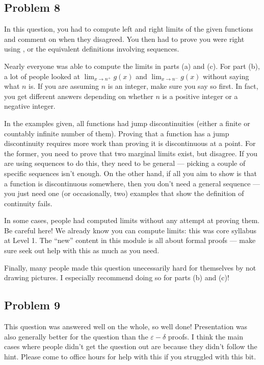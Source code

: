 \documentclass[letterpaper,10pt,english]{jupyterBook}
\begin{document}
\subsection{Problem 8}
\label{\detokenize{HW-feedback:problem-8}}
\sphinxAtStartPar
In this question, you had to compute left and right limits of the given functions and comment on when they disagreed. You then had to prove you were right using , or the equivalent definitions involving sequences.

\sphinxAtStartPar
Nearly everyone was able to compute the limits in parts (a) and (c). For part (b), a lot of people looked at \(\lim_{x\rightarrow n^+}g(x)\) and \(\lim_{x\rightarrow n^-}g(x)\) without saying what \(n\) is. If you are assuming \(n\) is an integer, make sure you say so first. In fact, you get different answers depending on whether \(n\) is a positive integer or a negative integer.

\sphinxAtStartPar
In the examples given, all functions had jump discontinuities (either a finite or countably infinite number of them). Proving that a function has a jump discontinuity requires more work than proving it is discontinuous at a point. For the former, you need to prove that two marginal limits exist, but disagree. If you are using sequences to do this, they need to be general — picking a couple of specific sequences isn’t enough. On the other hand, if all you aim to show is that a function is discontinuous somewhere, then you don’t need a general sequence — you just need one (or occasionally, two) examples that show the definition of continuity fails.

\sphinxAtStartPar
In some cases, people had computed limits without any attempt at proving them. Be careful here! We already know you can compute limits: this was core syllabus at Level 1. The “new” content in this module is all about formal proofs — make sure seek out help with this as much as you need.

\sphinxAtStartPar
Finally, many people made this question unecessarily hard for themselves by not drawing pictures. I especially recommend doing so for parts (b) and (c)!


\subsection{Problem 9}
\label{\detokenize{HW-feedback:problem-9}}
\sphinxAtStartPar
This question was answered well on the whole, so well done! Presentation was also generally better for the question than the \(\varepsilon-\delta\) proofs. I think the main cases where people didn’t get the question out are because they didn’t follow the hint. Please come to office hours for help with this if you struggled with this bit.
\end{document}
